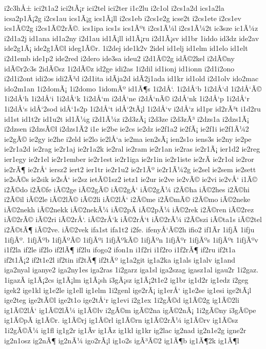 {i2c3hÅ±
ici2t1a2
ici2tÃ¡r
ici2tel
ici2ter
i1c2lu
i2c1ol
i2cs1a2d
ics1a2la
icsa2p1Ã¡2g
i2cs1au
ics1Ã¡g
ics1Ã¡ll
i2cs1eb
i2cs1e2g
icse2t
i2cs1ete
i2cs1ev
ics1Ã©2g
i2cs1Ã©2rÃ©.
ics1ipa
ics1s
ics1Ãºt
i2cs1Ã¼l
i2cs1Ã¼2t
ic3sze
ic1Ã¼z
i2d1a2j
id1ana
id1a2ny
i2d1au
id1Ã¡ll
id1Ã¡ru
i2d1Ã¡sv
id1br
1iddo
id3dz
ide2av
ide2g1Ã¡
ide2g1Ã©l
ideg1Ã©r.
1i2dej
ide1k2v
2idel
id1elj
id1elm
id1elo
id1elt
i2d1emb
ide1p2
ide2red
i2dero
ide3sa
ideu2
i2d1Ã©2g
idÃ©2kel
i2dÃ©ny
idÃ©r2c3s
2idÃ©sz
1i2dÃ©z
id2ge
idi2as
1i2dil
id1ionj
id1ionn
i2d1i2ono
i2d1i2ont
idi2os
idi2Ã³d
i2d1ita
idÃ­ja2d
idÃ­2j1ada
id1kr
id1old
i2d1olv
ido2mac
ido2m1an
1i2domÃ¡
1i2domo
1idomÃº
id1Ã¶s
1i2dÅ‘.
1i2dÅ‘b
1i2dÅ‘d
1i2dÅ‘Ã©
1i2dÅ‘h
1i2dÅ‘i
1i2dÅ‘k
1i2dÅ‘m
i2dÅ‘ne
i2dÅ‘nÃ©
i2dÅ‘nk
1i2dÅ‘p
1i2dÅ‘r
1i2dÅ‘s
idÅ‘2sod
idÅ‘1s2p
1i2dÅ‘t
idÅ‘2tÃ¡l
1i2dÅ‘v
i2dÅ‘z
id1pr
id2rÃ³t
i1d2ru
id1st
id1t2r
id1u2t
id1Ã¼g
i2d1Ã¼z
i2d3zÃ¡
i2d3ze
i2d3zÃ³
i2dzs1a
i2dzs1Ã¡
i2dzsen
i2dzsÃ©l
i2dzs1Ã­2
i1e
ie2be
ie2cs
ie2dz
ie2f1a2
ie2fÃ¡
ie2f1i
ie2f1Ã¼2
ie2gÃ©
ie2gy
ie2he
i2eld
ie2lo
ie2lÅ‘a
ie2ma
ien2sÃ¡
ien2s1o
iens3s
ie2ny
ie2pe
ie2r1a2d
ie2rag
ie2r1aj
ie2r1a2k
ie2ral
ie2ram
ie2r1an
ie2ras
ie2r1Ã¡
ier1d2
ie2reg
ier1egy
ie2r1el
ie2r1ember
ie2r1est
ie2r1iga
ie2r1in
ie2r1iste
ie2rÃ­
ie2r1ol
ie2ror
ie2rÃ¶
ie2rÅ‘
iersz2
iert2
ier1tr
ie2r1u2
ie2r1Ãº
ie2r1Ã¼2g
ie2sel
ie2sem
ie2sett
ie2sÃ©s
ie2sik
ie2sÅ‘
ie2sz
ietÃ©1sz2
ietz1
ie2ur
ie2ve
ie2vÃ©
ie2vi
ie2vÅ‘
i1Ã©
i2Ã©do
i2Ã©fe
iÃ©2ge
iÃ©2gÃ©
iÃ©2gÅ‘
iÃ©2gÃ¼
i2Ã©ha
iÃ©2hes
i2Ã©hi
i2Ã©il
iÃ©2le
iÃ©2lÃ©
iÃ©2li
iÃ©2lÅ‘
i2Ã©me
i2Ã©mÃ©
i2Ã©mo
iÃ©2neke
iÃ©2nekh
iÃ©2nekk
iÃ©2nekÃ¼
iÃ©2pÃ­
iÃ©2pÃ¼
iÃ©2rek
i2Ã©ren
iÃ©2rez
iÃ©2rÃ©
iÃ©2ri
iÃ©2rÅ‘.
iÃ©2rÅ‘k
iÃ©2rÅ‘t
iÃ©2rÃ¼
i2Ã©szi
iÃ©ta1s
iÃ©2tel
i2Ã©tÃ¶
iÃ©2ve.
iÃ©2vek
ifa1st
ifa1t2
i2fe.
ifenyÅ‘Ã©2h
ifio2
if1Ã­r
1ifjÃ­
1ifju
1ifjÃº.
1ifjÃºb
1ifjÃºÃ©
1ifjÃºi
1ifjÃºkÃ©
1ifjÃºn
1ifjÃºr
1ifjÃºs
1ifjÃºt
1ifjÃºv
i1f2la
if2le
if2lo
if2lÃ¶
if2lu
ifogo2
ifon1n
i1f2ri
i1f2ro
i1f2rÃ¶
if2ru
if2t1a
if2t1Ã¡2
if2t1e2l
if2tin
if2tÃ¶
if2tÃº
ig1a2git
ig1a2ka
ig1als
ig1alv
ig1and
iga2nyal
iganye2
iga2ny1es
iga2ras
1i2garz
iga1sl
iga2szag
igasz1al
igau2r
1i2gaz.
1igazÃ­
ig1Ã¡2cs
ig1Ã¡lm
ig1Ã¡sh
i3gÃ¡sz
ig1Ã¡2t1e2
ig1br
ig1d2r
ig1edz
i2geg
igek2
ige1kl
ig1e2le
ig1ell
ig1elm
1i2genl
ige2rÃ¡
ig1erÅ‘
ig1e2se
ig1esi
ige2tÃ¡l
ige2teg
ige2tÃ©l
ige2t1o
ige2tÅ‘r
ig1evi
i2g1ex
1i2gÃ©d
ig1Ã©2g
ig1Ã©2li
ig1Ã©2lÅ‘
ig1Ã©2lÃ¼
ig1Ã©lv
i2gÃ©m
igÃ©2na
igÃ©2nÃ¡
1i2gÃ©ny
i3gÃ©pe
ig1Ã©pÃ­
ig1Ã©r.
ig1Ã©rj
ig1Ã©rl
ig1Ã©rn
ig1Ã©2rÃ¼
ig1Ã©rv
ig1Ã©sz
1i2gÃ©Ã¼
ig1fl
ig1g2r
ig1Ã­v
ig1Ã­z
ig1kl
ig1kr
ig2lac
ig2nad
ig2n1e2g
igne2r
ig2n1osz
ig2nÃ¶
ig2nÃ¼
igo2rÃ¡l
ig1o2s
igÃ³Ã©2
ig1Ã¶b
ig1Ã¶2k
ig1Ã¶l
}

